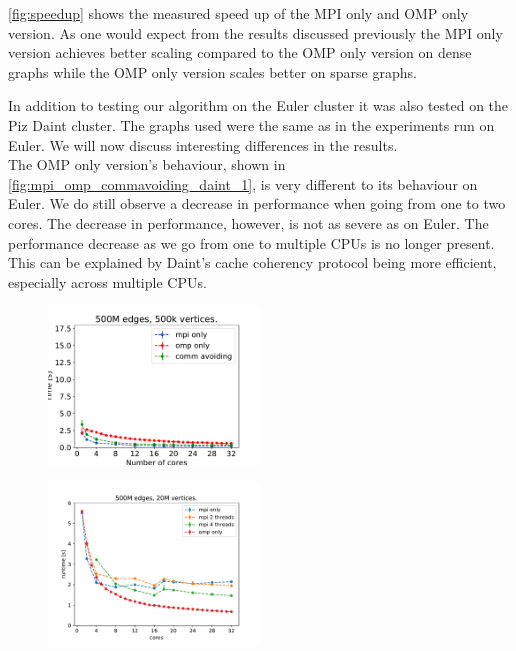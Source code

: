 \autoref{fig:speedup} shows the measured speed up of the MPI only and OMP only version. As one
would expect from the results discussed previously the MPI only version achieves better scaling
compared to the OMP only version on dense graphs while the OMP only version scales better on sparse
graphs.

In addition to testing our algorithm on the Euler cluster it was also tested on the Piz Daint cluster. The graphs used were the same as in the experiments run on Euler. We will now discuss interesting differences in the results.\\
The OMP only version's behaviour, shown in \autoref{fig:mpi_omp_commavoiding_daint_1}, is very different to its behaviour on Euler. We do still observe a decrease in performance when going from one to two cores. The decrease in performance, however, is not as severe as on Euler. The performance decrease as we go from one to multiple CPUs is no longer present. This can be explained by Daint's cache coherency protocol being more efficient, especially across multiple CPUs. 

\begin{figure}
\includegraphics[width=0.5\textwidth]{data/plot_vertices_500k}
\label{fig:mpi_omp_commavoiding_daint_1}
\end{figure}

\begin{figure}
\includegraphics[width=0.5\textwidth]{data/plot_vertices_without_commavoid_20M.pdf}
\end{figure}

